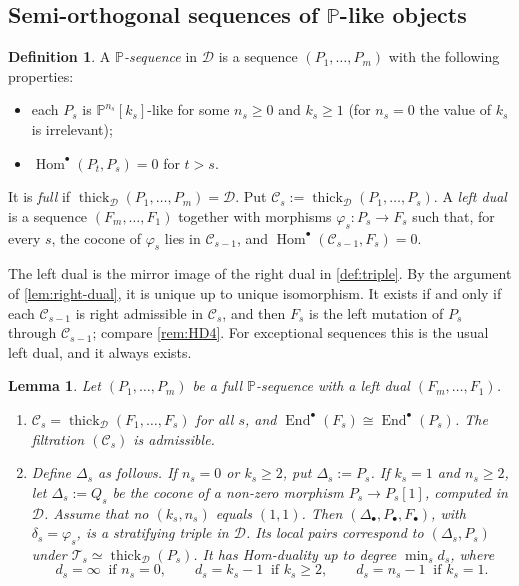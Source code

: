\documentclass[11pt,reqno]{amsart}
\theoremstyle{plain}
\newtheorem{lemma}[theorem]{Lemma}
\theoremstyle{definition}
\newtheorem{definition}[theorem]{Definition}
\theoremstyle{remark}
\DeclareMathOperator{\Hom}{Hom}
\DeclareMathOperator{\End}{End}
\newcommand{\thick}[2][\cD]{\operatorname{thick}_{#1}(#2)}
\newcommand{\Pn}[2]{\mathbb{P}^{#1}[#2]}
\newcommand{\cD}{\mathcal{D}}
\newcommand{\cT}{\mathcal{T}}
\newcommand{\cC}{\mathcal{C}}
\begin{document}
\subsection{Semi-orthogonal sequences of \texorpdfstring{$\mathbb{P}$}{P}-like objects}\label{sec:P-sequences}

\begin{definition}\label{def:P-sequence}
A \emph{$\mathbb{P}$-sequence} in $\cD$ is a sequence $(P_1,\dots,P_m)$ with the following properties:
\begin{itemize}
\item each $P_s$ is $\Pn{n_s}{k_s}$-like for some $n_s\ge0$ and $k_s\ge1$ (for $n_s=0$ the value of $k_s$ is irrelevant);
\item $\Hom^\bullet(P_t,P_s)=0$ for $t>s$.
\end{itemize}
It is \emph{full} if $\thick{P_1,\dots,P_m}=\cD$. Put $\cC_s:=\thick{P_1,\dots,P_s}$. A \emph{left dual} is a sequence $(F_m,\dots,F_1)$ together with morphisms $\varphi_s\colon P_s\to F_s$ such that, for every $s$, the cocone of $\varphi_s$ lies in $\cC_{s-1}$, and $\Hom^\bullet(\cC_{s-1},F_s)=0$.
\end{definition}

The left dual is the mirror image of the right dual in \cref{def:triple}. By the argument of \cref{lem:right-dual}, it is unique up to unique isomorphism. It exists if and only if each $\cC_{s-1}$ is right admissible in $\cC_s$, and then $F_s$ is the left mutation of $P_s$ through $\cC_{s-1}$; compare \cref{rem:HD4}. For exceptional sequences this is the usual left dual, and it always exists.

\begin{lemma}\label{lem:P-triple}
Let $(P_1,\dots,P_m)$ be a full $\mathbb{P}$-sequence with a left dual $(F_m,\dots,F_1)$.
\begin{enumerate}
\item $\cC_s=\thick{F_1,\dots,F_s}$ for all $s$, and $\End^\bullet(F_s)\cong\End^\bullet(P_s)$. The filtration $(\cC_s)$ is admissible.
\item Define $\Delta_s$ as follows. If $n_s=0$ or $k_s\ge2$, put $\Delta_s:=P_s$. If $k_s=1$ and $n_s\ge2$, let $\Delta_s:=Q_s$ be the cocone of a non-zero morphism $P_s\to P_s[1]$, computed in $\cD$. Assume that no $(k_s,n_s)$ equals $(1,1)$. Then $(\Delta_\bullet,P_\bullet,F_\bullet)$, with $\delta_s=\varphi_s$, is a stratifying triple in $\cD$. Its local pairs correspond to $(\Delta_s,P_s)$ under $\cT_s\simeq\thick{P_s}$. It has Hom-duality up to degree $\min_s d_s$, where
\[d_s=\infty\ \text{ if } n_s=0,\qquad d_s=k_s-1\ \text{ if } k_s\ge2,\qquad d_s=n_s-1\ \text{ if } k_s=1.\]
\end{enumerate}
\end{lemma}
\end{document}
